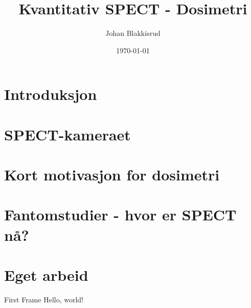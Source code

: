 \documentclass{beamer}
\title{Kvantitativ SPECT - Dosimetri}
\date{\today}
\author{Johan Blakkisrud}
\institute{Avd. for Diagnostisk Fysikk, Oslo Universitetssykehus}
\begin{document}
\maketitle

\section{Introduksjon}
\section{SPECT-kameraet}
\section{Kort motivasjon for dosimetri}
\section{Fantomstudier - hvor er SPECT nå?}
\section{Eget arbeid}

\begin{frame}{First Frame}
  Hello, world!
\end{frame}
\end{document}
